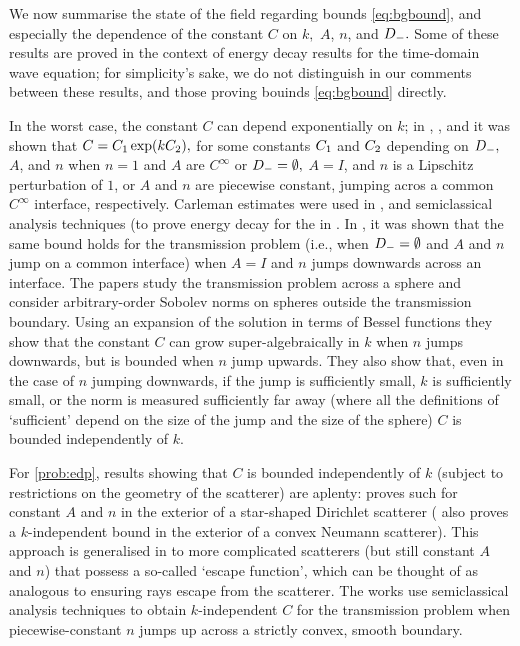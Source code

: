 We now summarise the state of the field regarding bounds \eqref{eq:bgbound}, and especially the dependence of the constant $C$ on $k,$ $A$, $n$, and $D_{-}.$ Some of these results are proved in the context of energy decay results for the time-domain wave equation; for simplicity's sake, we do not distinguish in our comments between these results, and those proving bouinds \eqref{eq:bgbound} directly.

    In the worst case, the constant $C$ can depend exponentially on $k$; in \cite{Bu:98}, \cite{Sh:18}, and \cite{Be:02} it was shown that $C = C_{1} \exp(kC_{2}),$ for some constants $C_{1}$ and $C_{2}$ depending on $D_{-}, $ $A$, and $n$ when $n=1$ and $A$ are $C^\infty$ or $D_{-} = \emptyset,$ $A=I$, and $n$ is a Lipschitz perturbation of $1$, or $A$ and $n$ are piecewise constant, jumping acros a common $C^\infty$ interface, respectively. Carleman estimates were used in \cite{Bu:98,Be:02}, and semiclassical analysis techniques (to prove energy decay for the in \cite{Sh:18}. In \cite{PoVo:99a}, it was shown that the same bound holds for the transmission problem (i.e., when $D_{-}=\emptyset$ and $A$ and $n$ jump on a common interface) when $A=I$ and $n$ jumps downwards across an interface. The papers \cite{Ca:12,CaLePa:13} study the transmission problem across a sphere and consider arbitrary-order Sobolev norms on spheres outside the transmission boundary. Using an expansion of the solution in terms of Bessel functions they show that the constant $C$ can grow super-algebraically in $k$ when $n$ jumps downwards, but is bounded when $n$ jump upwards. They also show that, even in the case of $n$ jumping downwards, if the jump is sufficiently small, $k$ is sufficiently small, or the norm is measured sufficiently far away (where all the definitions of `sufficient' depend on the size of the jump and the size of the sphere) $C$ is bounded independently of $k.$

    For \cref{prob:edp}, results showing that $C$ is bounded independently of $k$ (subject to restrictions on the geometry of the scatterer) are aplenty: \cite{Mo:61,MoLu:68,Mo:75} proves such for constant $A$ and $n$ in the exterior of a star-shaped Dirichlet scatterer (\cite{Mo:75} also proves a $k$-independent bound in the exterior of a convex Neumann scatterer). This approach is generalised in \cite{MoRaSt:77} to more complicated scatterers (but still constant $A$ and $n$) that possess a so-called `escape function', which can be thought of as analogous to ensuring rays escape from the scatterer. The works \cite{CaPoVo:99,PoVo:99b} use semiclassical analysis techniques to obtain $k$-independent $C$ for the transmission problem when piecewise-constant $n$ jumps up across a strictly convex, smooth boundary.

